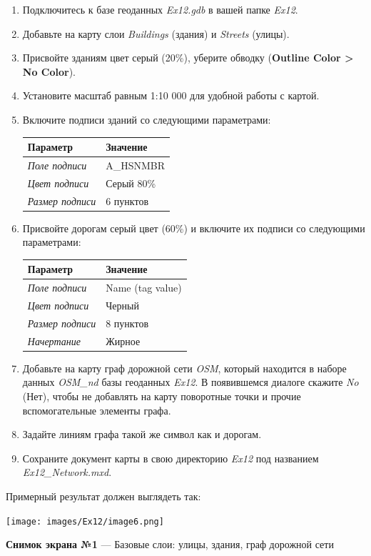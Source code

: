 \documentclass[12pt,]{book}
\begin{document}
\begin{enumerate}
\def\labelenumi{\arabic{enumi}.}
\item
  Подключитесь к базе геоданных \emph{Ex12.gdb} в вашей папке \emph{Ex12}.
\item
  Добавьте на карту слои \emph{Buildings} (здания) и \emph{Streets} (улицы).
\item
  Присвойте зданиям цвет серый (20\%), уберите обводку (\textbf{Outline Color \textgreater{} No Color}).
\item
  Установите масштаб равным 1:10 000 для удобной работы с картой.
\item
  Включите подписи зданий со следующими параметрами:

  \begin{longtable}[]{@{}ll@{}}
  \toprule
  Параметр & Значение\tabularnewline
  \midrule
  \endhead
  \emph{Поле подписи} & A\_HSNMBR\tabularnewline
  \emph{Цвет подписи} & Серый 80\%\tabularnewline
  \emph{Размер подписи} & 6 пунктов\tabularnewline
  \bottomrule
  \end{longtable}
\item
  Присвойте дорогам серый цвет (60\%) и включите их подписи со следующими параметрами:

  \begin{longtable}[]{@{}ll@{}}
  \toprule
  Параметр & Значение\tabularnewline
  \midrule
  \endhead
  \emph{Поле подписи} & Name (tag value)\tabularnewline
  \emph{Цвет подписи} & Черный\tabularnewline
  \emph{Размер подписи} & 8 пунктов\tabularnewline
  \emph{Начертание} & Жирное\tabularnewline
  \bottomrule
  \end{longtable}
\item
  Добавьте на карту граф дорожной сети \emph{OSM}, который находится в наборе данных \emph{OSM\_nd} базы геоданных \emph{Ex12}. В появившемся диалоге скажите \emph{No} (Нет), чтобы не добавлять на карту поворотные точки и прочие вспомогательные элементы графа.
\item
  Задайте линиям графа такой же символ как и дорогам.
\item
  Сохраните документ карты в свою директорию \emph{Ex12} под названием \emph{Ex12\_Network.mxd}.
\end{enumerate}

Примерный результат должен выглядеть так:

\texttt{[image: images/Ex12/image6.png]}

\textbf{Снимок экрана №1} --- Базовые слои: улицы, здания, граф дорожной сети
\end{document}
